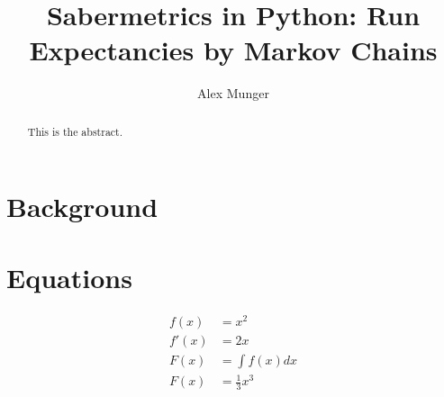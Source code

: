 \documentclass{article}
\title{Sabermetrics in Python: Run Expectancies by Markov Chains}
\author{Alex Munger}
\begin{document}
\maketitle

\begin{abstract}
	This is the abstract.
\end{abstract}

\section{Background}

\section{Equations}

\begin{align}
	f(x) &= x^2\\
	f'(x) &= 2x\\
	F(x) &= \int f(x)dx\\
	F(x) &= \frac{1}{3}x^3
\end{align}
\end{document}
